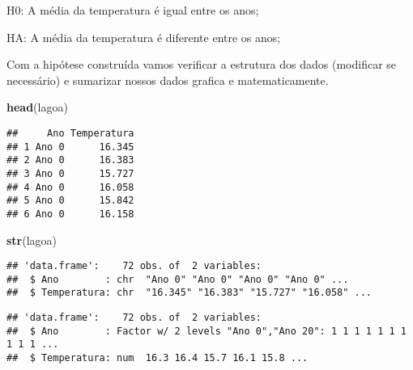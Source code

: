 \documentclass[]{book}
\newenvironment{Shaded}{\begin{snugshade}}{\end{snugshade}}
\newcommand{\CommentTok}[1]{\textcolor[rgb]{0.56,0.35,0.01}{\textit{#1}}}
\newcommand{\DataTypeTok}[1]{\textcolor[rgb]{0.13,0.29,0.53}{#1}}
\newcommand{\DecValTok}[1]{\textcolor[rgb]{0.00,0.00,0.81}{#1}}
\newcommand{\KeywordTok}[1]{\textcolor[rgb]{0.13,0.29,0.53}{\textbf{#1}}}
\newcommand{\NormalTok}[1]{#1}
\newcommand{\OperatorTok}[1]{\textcolor[rgb]{0.81,0.36,0.00}{\textbf{#1}}}
\newcommand{\StringTok}[1]{\textcolor[rgb]{0.31,0.60,0.02}{#1}}
\begin{document}
H0: A média da temperatura é igual entre os anos;

HA: A média da temperatura é diferente entre os anos;

Com a hipótese construída vamos verificar a estrutura dos dados (modificar se necessário) e sumarizar nossos dados grafica e matematicamente.

\begin{Shaded}
\begin{Highlighting}[]
\KeywordTok{head}\NormalTok{(lagoa)}
\end{Highlighting}
\end{Shaded}

\begin{verbatim}
##     Ano Temperatura
## 1 Ano 0      16.345
## 2 Ano 0      16.383
## 3 Ano 0      15.727
## 4 Ano 0      16.058
## 5 Ano 0      15.842
## 6 Ano 0      16.158
\end{verbatim}

\begin{Shaded}
\begin{Highlighting}[]
\KeywordTok{str}\NormalTok{(lagoa)}
\end{Highlighting}
\end{Shaded}

\begin{verbatim}
## 'data.frame':    72 obs. of  2 variables:
##  $ Ano        : chr  "Ano 0" "Ano 0" "Ano 0" "Ano 0" ...
##  $ Temperatura: chr  "16.345" "16.383" "15.727" "16.058" ...
\end{verbatim}

\begin{Shaded}
\end{Shaded}

\begin{verbatim}
## 'data.frame':    72 obs. of  2 variables:
##  $ Ano        : Factor w/ 2 levels "Ano 0","Ano 20": 1 1 1 1 1 1 1 1 1 1 ...
##  $ Temperatura: num  16.3 16.4 15.7 16.1 15.8 ...
\end{verbatim}

\begin{Shaded}
\end{Shaded}
\end{document}

